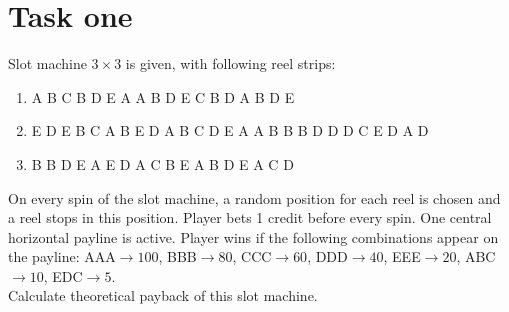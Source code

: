 \documentclass[11pt]{article}
\theoremstyle{definition}
\begin{document}
\section{Task one}
Slot machine $3 \times 3$ is given, with following reel strips:
\begin{enumerate}
\item A B C B D E A A B D E C B D A B D E
\item E D E B C A B E D A B C D E A A B B B D D D C E D A D
\item B B D E A E D A C B E A B D E A C D
\end{enumerate}

On every spin of the slot machine, a random position for each reel is chosen and a reel stops in this position. Player bets 1 credit before every spin. One central horizontal payline is active. Player wins if the following combinations appear on the payline: 
AAA$\rightarrow 100$, BBB$\rightarrow 80$, CCC$\rightarrow 60$, DDD$\rightarrow 40$, EEE$\rightarrow 20$, ABC$\rightarrow 10$, EDC$\rightarrow 5$. \\
Calculate theoretical payback of this slot machine.
\end{document}
